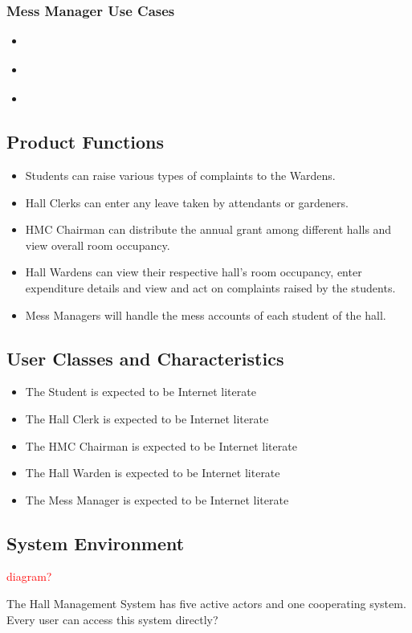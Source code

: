 \documentclass[letterpaper,12pt]{article}
\begin{document}
\subsubsection{Mess Manager Use Cases}
\begin{itemize}
    \item \textbf{}
    \item \textbf{}
    \item \textbf{}
\end{itemize}
\subsection{\Large Product Functions}
\begin{itemize}
    \item Students can raise various types of complaints to the Wardens.
    \item Hall Clerks can enter any leave taken by attendants or gardeners.
    \item HMC Chairman can distribute the annual grant among different halls and view overall room occupancy.
    \item Hall Wardens can view their respective hall's room occupancy, enter expenditure details and view and act on complaints raised by the students.
    \item Mess Managers will handle the mess accounts of each student of the hall.
\end{itemize}
\subsection{\Large User Classes and Characteristics}
\begin{itemize}
    \item The Student is expected to be Internet literate
    \item The Hall Clerk is expected to be Internet literate
    \item The HMC Chairman is expected to be Internet literate
    \item The Hall Warden is expected to be Internet literate
    \item The Mess Manager is expected to be Internet literate
\end{itemize}
\subsection{\Large System Environment}
\textcolor{red}{diagram?}

The Hall Management System has five active actors and one cooperating system. Every user can access this system directly?
\end{document}
